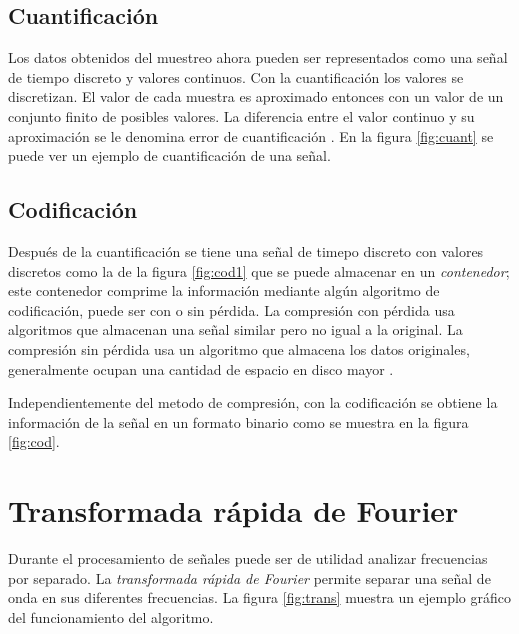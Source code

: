 

\subsection{Cuantificaci\'on}

Los datos obtenidos del muestreo ahora pueden ser representados como una se\~nal de tiempo discreto y valores continuos. Con la cuantificaci\'on los valores se discretizan. El valor de cada muestra es aproximado entonces con un valor de un conjunto finito de posibles valores. La diferencia entre el valor continuo y su aproximaci\'on se le denomina error de cuantificaci\'on \cite{Baher}. En la figura \ref{fig:cuant} se puede ver un ejemplo de cuantificaci\'on de una se\~nal.



\subsection{Codificaci\'on}

Despu\'es de la cuantificaci\'on se tiene una se\~nal de timepo discreto con valores discretos como la de la figura \ref{fig:cod1} que se puede almacenar en un {\em contenedor}; este contenedor comprime la informaci\'on mediante alg\'un algoritmo de codificaci\'on, puede ser con o sin p\'erdida. La compresi\'on con p\'erdida usa algoritmos que almacenan una se\~nal similar pero no igual a la original. La compresi\'on sin p\'erdida usa un algoritmo que almacena los datos originales, generalmente ocupan una cantidad de espacio en disco mayor \cite{StevenAudio}.




\noindent Independientemente del metodo de compresi\'on, con la codificaci\'on se obtiene la informaci\'on de la se\~nal en un formato binario como se muestra en la figura \ref{fig:cod}.


\section {Transformada r\'apida de Fourier}

Durante el procesamiento de se\~nales puede ser de utilidad analizar frecuencias por separado. La {\em transformada r\'apida de Fourier} permite separar una se\~nal de onda en sus diferentes frecuencias. La figura \ref{fig:trans} muestra un ejemplo gr\'afico del funcionamiento del algoritmo.

